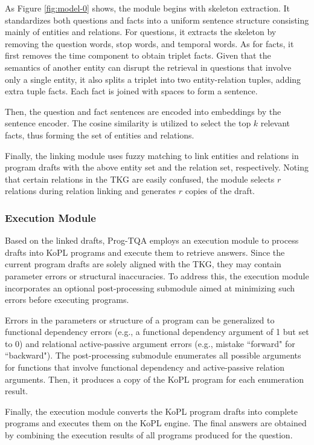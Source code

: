\documentclass[10pt, a4paper]{article}
\begin{document}
As Figure \ref{fig:model-0} shows, the module begins with skeleton extraction. It standardizes both questions and facts into a uniform sentence structure consisting mainly of entities and relations. For questions, it extracts the skeleton by removing the question words, stop words, and temporal words. As for facts, it first removes the time component to obtain triplet facts. Given that the semantics of another entity can disrupt the retrieval in questions that involve only a single entity, it also splits a triplet into two entity-relation tuples, adding extra tuple facts. Each fact is joined with spaces to form a sentence.

Then, the question and fact sentences are encoded into embeddings by the sentence encoder. The cosine similarity is utilized to select the top $k$ relevant facts, thus forming the set of entities and relations.

Finally, the linking module uses fuzzy matching to link entities and relations in program drafts with the above entity set and the relation set, respectively.
Noting that certain relations in the TKG are easily confused, the module selects $r$ relations during relation linking and generates $r$ copies of the draft.
\subsubsection{Execution Module}\label{sec:exec}
Based on the linked drafts, Prog-TQA employs an execution module to process drafts into KoPL programs and execute them to retrieve answers. Since the current program drafts are solely aligned with the TKG, they may contain parameter errors or structural inaccuracies. To address this, the execution module incorporates an optional post-processing submodule aimed at minimizing such errors before executing programs.

Errors in the parameters or structure of a program can be generalized to functional dependency errors (e.g., a functional dependency argument of 1 but set to 0) and relational active-passive argument errors (e.g., mistake ``forward" for ``backward"). The post-processing submodule enumerates all possible arguments for functions that involve functional dependency and active-passive relation arguments. Then, it produces a copy of the KoPL program for each enumeration result. 

Finally, the execution module converts the KoPL program drafts into complete programs and executes them on the KoPL engine. The final answers are obtained by combining the execution results of all programs produced for the question.
\end{document}
